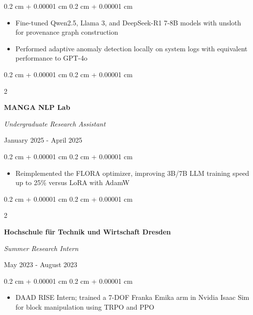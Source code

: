 \documentclass[10pt, letterpaper]{article}
\newenvironment{highlights}{
    \begin{itemize}[
        topsep=0.09 cm,
        parsep=0.09 cm,
        partopsep=0pt,
        itemsep=0pt,
        leftmargin=0.4 cm + 10pt
    ]
}{
    \end{itemize}
}
\newenvironment{onecolentry}{
    \begin{adjustwidth}{
        0.2 cm + 0.00001 cm
    }{
        0.2 cm + 0.00001 cm
    }
}{
    \end{adjustwidth}
}
\newenvironment{twocolentry}[2][]{
    \begin{adjustwidth}{
        0.2 cm + 0.00001 cm
    }{
        0.2 cm + 0.00001 cm
    }
    \def\secondColumn{#2}
    \setcolumnwidth{\fill, 5.2 cm}
    \begin{paracol}{2}
}{
    \switchcolumn \raggedleft \secondColumn
    \end{paracol}
    \end{adjustwidth}
}
\begin{document}
        \vspace{0.09 cm}
        \begin{onecolentry}
            \begin{highlights}
                \item Fine-tuned Qwen2.5, Llama 3, and DeepSeek-R1 7-8B models with unsloth for provenance graph construction
                \item Performed adaptive anomaly detection locally on system logs with equivalent performance to GPT-4o
            \end{highlights}
        \end{onecolentry}

        \vspace{0.09 cm}

        \begin{twocolentry}{
            January 2025 - April 2025
        }
            \textbf{MANGA NLP Lab}

            \textit{Undergraduate Research Assistant}
        \end{twocolentry}

        \vspace{0.09 cm}
        \begin{onecolentry}
            \begin{highlights}
                \item Reimplemented the FLORA optimizer, improving 3B/7B LLM training speed up to 25\% versus LoRA with AdamW
            \end{highlights}
        \end{onecolentry}

        \vspace{0.09 cm}

        \begin{twocolentry}{
            May 2023 - August 2023
        }
            \textbf{Hochschule für Technik und Wirtschaft Dresden}

            \textit{Summer Research Intern}
        \end{twocolentry}

        \vspace{0.09 cm}
        \begin{onecolentry}
            \begin{highlights}
                \item DAAD RISE Intern; trained a 7-DOF Franka Emika arm in Nvidia Isaac Sim for block manipulation using TRPO and PPO
            \end{highlights}
        \end{onecolentry}
\end{document}
